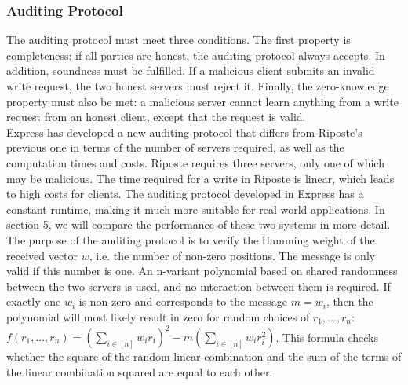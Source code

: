 \documentclass[a4paper]{article}
\begin{document}
\subsubsection{Auditing Protocol}
The auditing protocol must meet three conditions. The first property is completeness: if all parties are honest, the auditing protocol always accepts. In addition, soundness must be fulfilled. If a malicious client submits an invalid write request, the two honest servers must reject it. Finally, the zero-knowledge property must also be met: a malicious server cannot learn anything from a write request from an honest client, except that the request is valid. \\
Express has developed a new auditing protocol that differs from Riposte's previous one in terms of the number of servers required, as well as the computation times and costs. Riposte requires three servers, only one of which may be malicious. The time required for a write in Riposte is linear, which leads to high costs for clients. The auditing protocol developed in Express has a constant runtime, making it much more suitable for real-world applications. In section 5, we will compare the performance of these two systems in more detail.  \\
The purpose of the auditing protocol is to verify the Hamming weight of the received vector $w$, i.e. the number of non-zero positions. The message is only valid if this number is one. An n-variant polynomial based on shared randomness between the two servers is used, and no interaction between them is required. If exactly one $w_i$ is non-zero and corresponds to the message $m = w_i$, then the polynomial will most likely result in zero for random choices of $r_1, ..., r_n$: $f(r_1, ..., r_n) = (\sum_{i \in [n]}w_i r_i)^2 - m(\sum_{i \in [n]}w_i r_i^2)$.  This formula checks whether the square of the random linear combination and the sum of the terms of the linear combination squared are equal to each other. 
\end{document}
